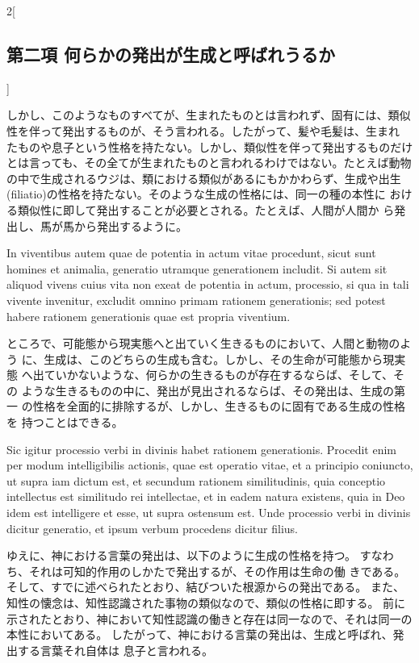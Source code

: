 \documentclass[paper=a4paper,fontsize=10pt,jafontsize=9pt,titlepage]{jlreq}
\begin{document}
\begin{paracol}{2}[\subsection{第二項 何らかの発出が生成と呼ばれうるか}]
\switchcolumn


しかし、このようなものすべてが、生まれたものとは言われず、固有には、類似
 性を伴って発出するものが、そう言われる。したがって、髪や毛髪は、生まれ
 たものや息子という性格を持たない。しかし、類似性を伴って発出するものだけ
とは言っても、その全てが生まれたものと言われるわけではない。たとえば動物
 の中で生成されるウジは、類における類似があるにもかかわらず、生成や出生
 (filiatio)の性格を持たない。そのような生成の性格には、同一の種の本性に
 おける類似性に即して発出することが必要とされる。たとえば、人間が人間か
 ら発出し、馬が馬から発出するように。


\switchcolumn*


In
viventibus autem quae de potentia in actum vitae procedunt, sicut sunt
homines et animalia, generatio utramque generationem includit. Si autem
sit aliquod vivens cuius vita non exeat de potentia in actum, processio,
si qua in tali vivente invenitur, excludit omnino primam rationem
generationis; sed potest habere rationem generationis quae est propria
viventium.


\switchcolumn


ところで、可能態から現実態へと出ていく生きるものにおいて、人間と動物のよう
 に、生成は、このどちらの生成も含む。しかし、その生命が可能態から現実態
 へ出ていかないような、何らかの生きるものが存在するならば、そして、その
 ような生きるものの中に、発出が見出されるならば、その発出は、生成の第一
 の性格を全面的に排除するが、しかし、生きるものに固有である生成の性格を
 持つことはできる。


\switchcolumn*


Sic igitur processio verbi in divinis habet rationem
generationis. Procedit enim per modum intelligibilis actionis, quae est
operatio vitae, et a principio coniuncto, ut supra iam dictum est, et
secundum rationem similitudinis, quia conceptio intellectus est
similitudo rei intellectae, et in eadem natura existens, quia in Deo
idem est intelligere et esse, ut supra ostensum est. Unde processio
verbi in divinis dicitur generatio, et ipsum verbum procedens dicitur
filius.


\switchcolumn


ゆえに、神における言葉の発出は、以下のように生成の性格を持つ。
すなわち、それは可知的作用のしかたで発出するが、その作用は生命の働
 きである。
そして、すでに述べられたとおり、結びついた根源からの発出である。
また、知性の懐念は、知性認識された事物の類似なので、類似の性格に即する。
前に示されたとおり、神において知性認識の働きと存在は同一なので、それは同一の本性においてある。
したがって、神における言葉の発出は、生成と呼ばれ、発出する言葉それ自体は
 息子と言われる。



\end{paracol}
\end{document}
